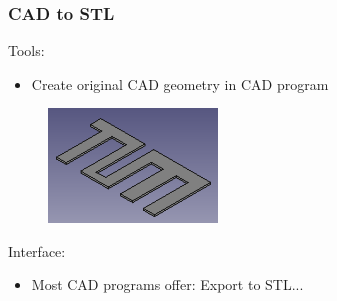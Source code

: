 
\begin{frame}
	\frametitle{CAD to STL}
	\begin{minipage}{0.85\textwidth}
	Tools:
		\begin{itemize}
		\item Create original CAD geometry in CAD program
		\end{itemize}
		\begin{figure}
		\includegraphics[width=0.4\textwidth]{Pictures/CAD/TUM.png}
		\end{figure}
		Interface:
		\begin{itemize}
		\item Most CAD programs offer: Export to STL...
		\end{itemize}
	\begin{figure}
	\end{figure}
	\end{minipage}
	\begin{minipage}{0.14\textwidth}
		\begin{figure}
					\\

\end{figure}
\end{minipage}
\end{frame}

